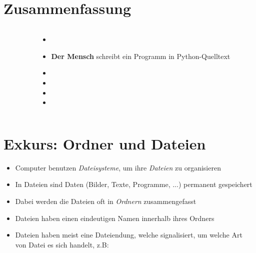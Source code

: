 \livecoding

\section{Zusammenfassung}
\begin{frame}[t]
	\slidehead
	\begin{columns}[T]
		\begin{column}{2cm}
		\end{column}
		\begin{column}{10cm}
			\begin{itemize}
				\item[]
				\item \textbf{Der Mensch} schreibt ein Programm in Python-Quelltext
				\item[]
				\item[]
				\item[]
				\item[]
			\end{itemize}
		\end{column}
	\end{columns}
\end{frame}

\section{Exkurs: Ordner und Dateien}
\begin{frame}
	\slidehead
	\begin{itemize}[<+->]
		\item Computer benutzen \emph{Dateisysteme}, um ihre \emph{Dateien} zu organisieren
		\item In Dateien sind Daten (Bilder, Texte, Programme, ...) permanent gespeichert
		\item Dabei werden die Dateien oft in \emph{Ordnern} zusammengefasst
		\item Dateien haben einen eindeutigen Namen innerhalb ihres Ordners
		\item Dateien haben meist eine Dateiendung, welche signalisiert, um welche Art von Datei es sich handelt, z.B: 
	\end{itemize}
\end{frame}


